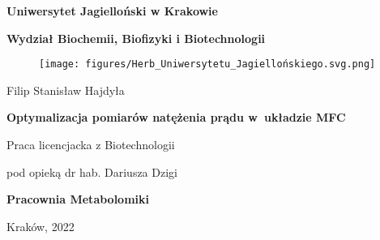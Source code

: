 \begin{titlepage}
    \thispagestyle{empty}
    \begin{center}
    
        \textbf{\large Uniwersytet Jagielloński w Krakowie}
        
        \vspace{0.5cm}
        
        \textbf{\Large Wydział Biochemii, Biofizyki i Biotechnologii}
        
        \vspace{0.5cm}
        
        \begin{figure}[h]
            \centering
            \texttt{[image: figures/Herb\_Uniwersytetu\_Jagiellońskiego.svg.png]}
            \label{fig:title}
        \end{figure}
        
        \vspace{0.5cm}
        
        {\Large Filip Stanisław Hajdyła}
        
        \vspace{2cm}
        
        \textbf{\huge Optymalizacja pomiarów natężenia prądu w~układzie MFC}
        
        \vspace{2cm}
        
        {\large Praca licencjacka z Biotechnologii}
        
        \vspace{0.5cm}
        
        {\large pod opieką dr hab. Dariusza Dzigi}
        
        \vspace{1cm}
        
        \textbf{\Large Pracownia Metabolomiki}
        
        \vspace{2cm}
        
        Kraków, 2022
        
    \end{center}
\end{titlepage}